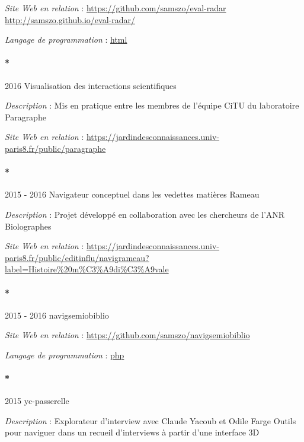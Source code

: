 \documentclass[
  a4paper,
  DIV=11,
  numbers=noendperiod]{scrreprt}
\let\oldparagraph\paragraph
\renewcommand{\paragraph}[1]{\oldparagraph{#1}\mbox{}}
\begin{document}
\emph{Site Web en relation} : \url{https://github.com/samszo/eval-radar}
\url{http://samszo.github.io/eval-radar/}

\emph{Langage de programmation} :
\href{http://localhost/samszo/omk/s/fiches/item/96621}{html}

\paragraph*{2016 Visualisation des interactions
scientifiques}\label{sec-item299729}

\emph{Description} : Mis en pratique entre les membres de l'équipe CiTU
du laboratoire Paragraphe

\emph{Site Web en relation} :
\url{https://jardindesconnaissances.univ-paris8.fr/public/paragraphe}

\paragraph*{2015 - 2016 Navigateur conceptuel dans les vedettes matières
Rameau}\label{sec-item299733}

\emph{Description} : Projet développé en collaboration avec les
chercheurs de l'ANR Biolographes

\emph{Site Web en relation} :
\url{https://jardindesconnaissances.univ-paris8.fr/public/editinflu/navigrameau?label=Histoire\%20m\%C3\%A9di\%C3\%A9vale}

\paragraph*{2015 - 2016 navigsemiobiblio}\label{sec-item301791}

\emph{Site Web en relation} :
\url{https://github.com/samszo/navigsemiobiblio}

\emph{Langage de programmation} :
\href{http://localhost/samszo/omk/s/fiches/item/108369}{php}

\paragraph*{2015 yc-passerelle}\label{sec-item299734}

\emph{Description} : Explorateur d'interview avec Claude Yacoub et Odile
Farge Outils pour naviguer dans un recueil d'interviews à partir d'une
interface 3D
\end{document}
